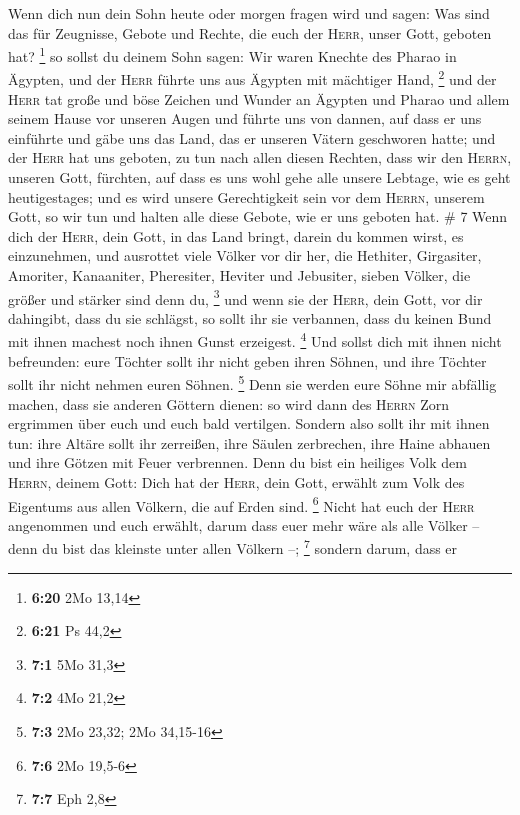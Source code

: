 Wenn dich nun dein Sohn heute oder morgen fragen wird
und sagen: Was sind das für Zeugnisse, Gebote und Rechte, die euch der
\textsc{Herr}, unser Gott, geboten hat? \footnote{\textbf{6:20} 2Mo
  13,14}  so sollst du deinem Sohn sagen: Wir waren
Knechte des Pharao in Ägypten, und der \textsc{Herr} führte uns aus
Ägypten mit mächtiger Hand, \footnote{\textbf{6:21} Ps 44,2}
 und der \textsc{Herr} tat große und böse Zeichen und
Wunder an Ägypten und Pharao und allem seinem Hause vor unseren Augen
 und führte uns von dannen, auf dass er uns einführte und
gäbe uns das Land, das er unseren Vätern geschworen hatte;
 und der \textsc{Herr} hat uns geboten, zu tun nach allen
diesen Rechten, dass wir den \textsc{Herrn}, unseren Gott, fürchten, auf
dass es uns wohl gehe alle unsere Lebtage, wie es geht heutigestages;
 und es wird unsere Gerechtigkeit sein vor dem
\textsc{Herrn}, unserem Gott, so wir tun und halten alle diese Gebote,
wie er uns geboten hat. \# 7  Wenn dich der \textsc{Herr},
dein Gott, in das Land bringt, darein du kommen wirst, es einzunehmen,
und ausrottet viele Völker vor dir her, die Hethiter, Girgasiter,
Amoriter, Kanaaniter, Pheresiter, Heviter und Jebusiter, sieben Völker,
die größer und stärker sind denn du, \footnote{\textbf{7:1} 5Mo 31,3}
 und wenn sie der \textsc{Herr}, dein Gott, vor dir
dahingibt, dass du sie schlägst, so sollt ihr sie verbannen, dass du
keinen Bund mit ihnen machest noch ihnen Gunst erzeigest. \footnote{\textbf{7:2}
  4Mo 21,2}  Und sollst dich mit ihnen nicht befreunden:
eure Töchter sollt ihr nicht geben ihren Söhnen, und ihre Töchter sollt
ihr nicht nehmen euren Söhnen. \footnote{\textbf{7:3} 2Mo 23,32; 2Mo
  34,15-16}  Denn sie werden eure Söhne mir abfällig
machen, dass sie anderen Göttern dienen: so wird dann des \textsc{Herrn}
Zorn ergrimmen über euch und euch bald vertilgen.  Sondern
also sollt ihr mit ihnen tun: ihre Altäre sollt ihr zerreißen, ihre
Säulen zerbrechen, ihre Haine abhauen und ihre Götzen mit Feuer
verbrennen.  Denn du bist ein heiliges Volk dem
\textsc{Herrn}, deinem Gott: Dich hat der \textsc{Herr}, dein Gott,
erwählt zum Volk des Eigentums aus allen Völkern, die auf Erden sind.
\footnote{\textbf{7:6} 2Mo 19,5-6}  Nicht hat euch der
\textsc{Herr} angenommen und euch erwählt, darum dass euer mehr wäre als
alle Völker -- denn du bist das kleinste unter allen Völkern --;
\footnote{\textbf{7:7} Eph 2,8}  sondern darum, dass er
